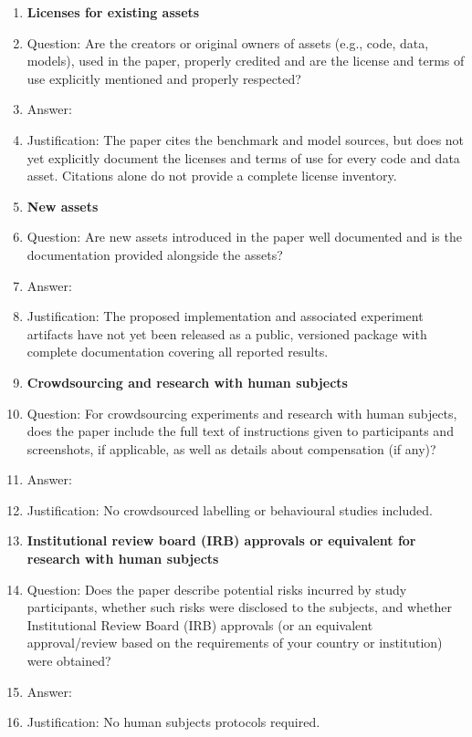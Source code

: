 \begin{enumerate}
\item {\bf Licenses for existing assets}
    \item[] Question: Are the creators or original owners of assets (e.g., code, data, models), used in the paper, properly credited and are the license and terms of use explicitly mentioned and properly respected?
    \item[] Answer: \answerYes{}
    \item[] Justification: The paper cites the benchmark and model sources, but does not yet
    explicitly document the licenses and terms of use for every code and
    data asset. Citations alone do not provide a complete license inventory.

\item {\bf New assets}
    \item[] Question: Are new assets introduced in the paper well documented and is the documentation provided alongside the assets?
    \item[] Answer: \answerYes{}
    \item[] Justification: The proposed implementation and associated experiment artifacts have
    not yet been released as a public, versioned package with complete
    documentation covering all reported results.

\item {\bf Crowdsourcing and research with human subjects}
    \item[] Question: For crowdsourcing experiments and research with human subjects, does the paper include the full text of instructions given to participants and screenshots, if applicable, as well as details about compensation (if any)?
    \item[] Answer: \answerNA{}
    \item[] Justification: No crowdsourced labelling or behavioural studies included.

\item {\bf Institutional review board (IRB) approvals or equivalent for research with human subjects}
    \item[] Question: Does the paper describe potential risks incurred by study participants, whether such risks were disclosed to the subjects, and whether Institutional Review Board (IRB) approvals (or an equivalent approval/review based on the requirements of your country or institution) were obtained?
    \item[] Answer: \answerNA{}
    \item[] Justification: No human subjects protocols required.


\end{enumerate}
